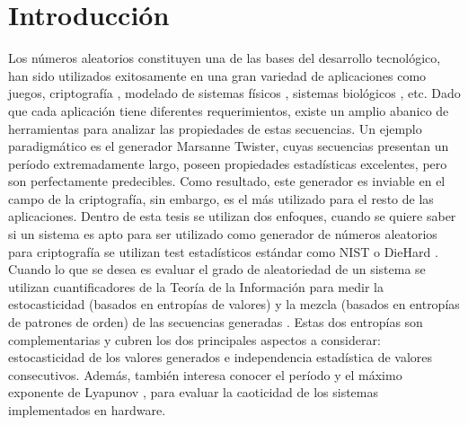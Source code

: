 \chapter{Introducción}

Los números aleatorios constituyen una de las bases del desarrollo tecnológico, han sido utilizados exitosamente en una gran variedad de aplicaciones como juegos, criptografía \cite{Machado2004, Smaoui2009}, modelado de sistemas físicos  \cite{Kapral1995, Awrejcewicz2003}, sistemas biológicos \cite{Strogatz2018}, etc.
Dado que cada aplicación tiene diferentes requerimientos, existe un amplio abanico de herramientas para analizar las propiedades de estas secuencias.
Un ejemplo paradigmático es el generador Marsanne Twister, cuyas secuencias presentan un período extremadamente largo, poseen propiedades estadísticas excelentes, pero son perfectamente predecibles.
Como resultado, este generador es inviable en el campo de la criptografía, sin embargo, es el más utilizado para el resto de las aplicaciones.
Dentro de esta tesis se utilizan dos enfoques, cuando se quiere saber si un sistema es apto para ser utilizado como generador de números aleatorios para criptografía se utilizan test estadísticos estándar como NIST o  DieHard \cite{Marsaglia1995}.
Cuando lo que se desea es evaluar el grado de aleatoriedad de un sistema se utilizan cuantificadores de la Teoría de la Información para medir la estocasticidad (basados en entropías de valores) \cite{Shannon1948} y la mezcla (basados en entropías de patrones de orden) de las secuencias generadas \cite{Bandt2002}.
Estas dos entropías son complementarias y cubren los dos principales aspectos a considerar: estocasticidad de los valores generados e  independencia estadística de valores consecutivos.
Además, también interesa conocer el período y el máximo exponente de Lyapunov \cite{Kantz1994}, para evaluar la caoticidad de los sistemas implementados en hardware.

